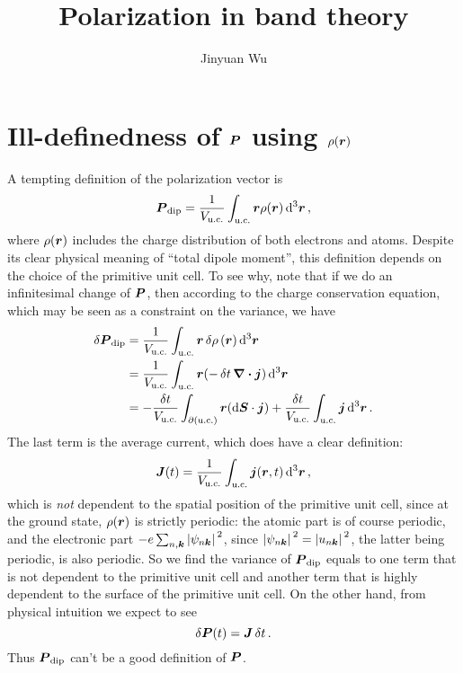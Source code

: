 \documentclass[hyperref, a4paper]{article}
\title{Polarization in band theory}
\author{Jinyuan Wu}
\begin{document}
\maketitle

\section{Ill-definedness of $\vb*{P}$ using $\rho(\vb*{r})$}

A tempting definition of the polarization vector is 
\begin{equation}
    \vb*{P}_{\text{dip}} = \frac{1}{V_{\text{u.c.}}} \int_{\text{u.c.}} \vb*{r} \rho(\vb*{r}) \dd[3]{\vb*{r}},
\end{equation}
where $\rho(\vb*{r})$ includes the charge distribution 
of both electrons and atoms.
Despite its clear physical meaning of ``total dipole moment'',
this definition depends on the choice of the primitive unit cell. 
To see why, note that if we do an infinitesimal change of $\vb*{P}$,
then according to the charge conservation equation, 
which may be seen as a constraint on the variance, 
we have 
\begin{equation}
    \begin{aligned}
        \var{\vb*{P}}_{\text{dip}} &= 
        \frac{1}{V_{\text{u.c.}}} \int_{\text{u.c.}} \vb*{r} \var{\rho}(\vb*{r}) \dd[3]{\vb*{r}} \\
        &= \frac{1}{V_{\text{u.c.}}} \int_{\text{u.c.}} \vb*{r} (- \var{t} \div{\vb*{j}}) \dd[3]{\vb*{r}} \\
        &= - \frac{\var{t}}{V_{\text{u.c.}}} \int_{\partial(\text{u.c.})} \vb*{r} (\dd{\vb*{S}} \cdot \vb*{j})
        + \frac{\var{t}}{V_{\text{u.c.}}} \int_{\text{u.c.}} \vb*{j} \dd[3]{\vb*{r}}.
    \end{aligned}
\end{equation}
The last term is the average current,
which does have a clear definition: 
\begin{equation}
    \vb*{J}(t) = \frac{1}{V_{\text{u.c.}}} \int_{\text{u.c.}} \vb*{j}(\vb*{r}, t) \dd[3]{\vb*{r}},
\end{equation}
which is \emph{not} dependent to the spatial position of the primitive unit cell, 
since at the ground state, 
$\rho(\vb*{r})$ is strictly periodic:
the atomic part is of course periodic,
and the electronic part $- e \sum_{n, \vb*{k}} \abs*{\psi_{n \vb*{k}}}^2$,
since $\abs*{\psi_{n \vb*{k}}}^2 = \abs*{u_{n \vb*{k}}}^2$,
the latter being periodic, 
is also periodic.
So we find the variance of $\vb*{P}_{\text{dip}}$ 
equals to one term that is not dependent to the primitive unit cell 
and another term that is highly dependent to the surface 
of the primitive unit cell. 
On the other hand, from physical intuition we expect to see 
\begin{equation}
    \var{\vb*{P}(t)} = \vb*{J} \var{t}.
    \label{eq:j-is-derivative-of-p}
\end{equation}
Thus $\vb*{P}_{\text{dip}}$ can't be a good definition of $\vb*{P}$.
\end{document}
